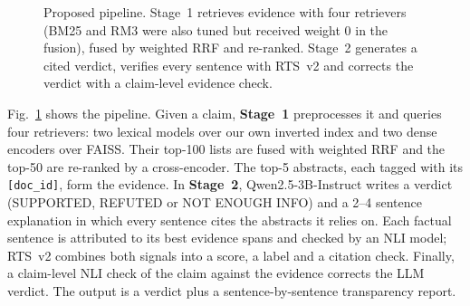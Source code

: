 \documentclass[conference]{IEEEtran}
\begin{document}
\begin{figure}[t]
{}
\caption{Proposed pipeline. Stage~1 retrieves evidence with four retrievers (BM25 and RM3 were also tuned but received
weight 0 in the fusion), fused by weighted RRF and re-ranked. Stage~2 generates a cited verdict, verifies every sentence
with RTS~v2 and corrects the verdict with a claim-level evidence check.}
\label{fig:pipeline}
\end{figure}

Fig.~\ref{fig:pipeline} shows the pipeline. Given a claim, \textbf{Stage~1} preprocesses it and queries four retrievers:
two lexical models over our own inverted index and two dense encoders over FAISS. Their top-100 lists are fused with
weighted RRF and the top-50 are re-ranked by a cross-encoder. The top-5 abstracts, each tagged with its \texttt{[doc\_id]},
form the evidence. In \textbf{Stage~2}, Qwen2.5-3B-Instruct \cite{qwen2024} writes a verdict (SUPPORTED, REFUTED or NOT
ENOUGH INFO) and a 2--4 sentence explanation in which every sentence cites the abstracts it relies on. Each factual
sentence is attributed to its best evidence spans and checked by an NLI model; RTS~v2 combines both signals into a score,
a label and a citation check. Finally, a claim-level NLI check of the claim against the evidence corrects the LLM verdict.
The output is a verdict plus a sentence-by-sentence transparency report.
\end{document}
